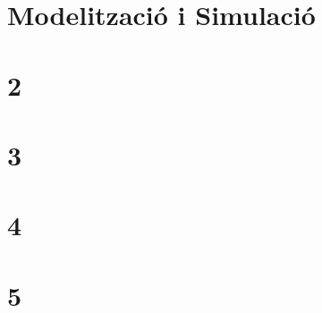 \documentclass[a4paper,12pt]{article}
\author{EDUARDO PÉREZ MOTATO}
\begin{document}
    
    \tableofcontents
    \section{Modelització i Simulació}
    
    \section{2}
    
    \section{3}
    
    \section{4}
    
    \section{5}
    
\end{document}
